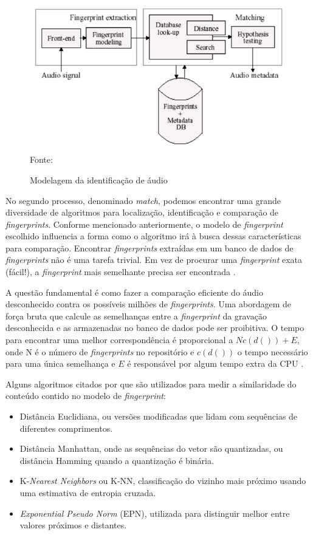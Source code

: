\begin{figure}[!htb]
   \centering
   \caption{Modelagem da identificação de áudio}\label{fig:identAudio} 
   \includegraphics[scale=0.62]{figuras/etapasFinger2.png}
   \\Fonte: \cite{henriques2003}
\end{figure}

No segundo processo, denominado \textit{match}, podemos encontrar uma grande diversidade de algoritmos para localização, identificação e comparação de \textit{fingerprints}. Conforme mencionado anteriormente, o modelo de \textit{fingerprint} escolhido influencia a forma como o algoritmo irá à busca dessas características para comparação. Encontrar \textit{fingerprints} extraídas em um banco de dados de \textit{fingerprints} não é uma tarefa trivial. Em vez de procurar uma \textit{fingerprint} exata (fácil!), a \textit{fingerprint} mais semelhante precisa ser encontrada \cite{haitsma2002}.

A questão fundamental é como fazer a comparação eficiente do áudio desconhecido contra os possíveis milhões de \textit{fingerprints}. Uma abordagem de força bruta que calcule as semelhanças entre a \textit{fingerprint} da gravação desconhecida e as armazenadas no banco de dados pode ser proibitiva. O tempo para encontrar uma melhor correspondência é proporcional a \({N c(d()) + E}\), onde N é o número de \textit{fingerprints} no repositório e \({c(d())}\) o tempo necessário para uma única semelhança e \({E}\) é responsável por algum tempo extra da CPU \cite{cano2005}.

Alguns algoritmos citados por  que são utilizados para medir a similaridade do conteúdo contido no modelo de \textit{fingerprint}:

\begin{itemize}
    \item Distância Euclidiana, ou versões modificadas que lidam com sequências de diferentes comprimentos.
    \item Distância Manhattan, onde as sequências do vetor são quantizadas, ou distância Hamming quando a quantização é binária.
    \item K-\textit{Nearest Neighbors} ou K-NN, classificação do vizinho mais próximo usando uma estimativa de entropia cruzada.
    \item \textit{Exponential Pseudo Norm} (EPN), utilizada para distinguir melhor entre valores próximos e distantes.
\end{itemize}

